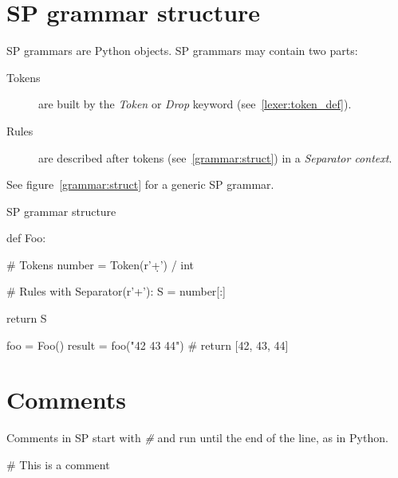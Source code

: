 \section{SP grammar structure}

SP grammars are Python objects.
SP grammars may contain two parts:

\begin{description}
    \item [Tokens]
        are built by the \emph{Token} or \emph{Drop} keyword (see~\ref{lexer:token_def}).
    \item [Rules]
        are described after tokens (see~\ref{grammar:struct}) in a \emph{Separator context}.
\end{description}

See figure~\ref{grammar:struct} for a generic SP grammar.

\begin{code}
\caption{SP grammar structure}                             \label{grammar:struct}
\begin{verbatimtab}[4]
def Foo:

    # Tokens
    number = Token(r'\d+') / int

    # Rules
    with Separator(r'\s+'):
        S = number[:]

    return S

foo = Foo()
result = foo("42 43 44") # return [42, 43, 44]
\end{verbatimtab}
\end{code}

\section{Comments}

Comments in SP start with \emph{\#} and run until the end of the line, as in Python.

\begin{verbatimtab}[4]
    # This is a comment
\end{verbatimtab}

